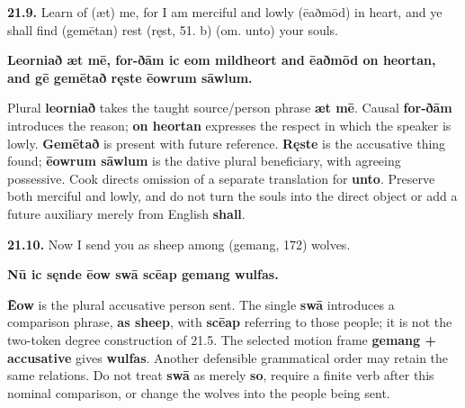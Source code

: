 \par\begin{minipage}{\linewidth}\raggedright
\textbf{21.9.} Learn of (æt) me, for I am merciful and lowly (ēaðmōd) in heart, and ye shall find (gemētan) rest (ręst, 51. b) (om. unto) your souls.

\textbf{Leorniað æt mē, for-ðām ic eom mildheort and ēaðmōd on heortan, and gē gemētað ręste ēowrum sāwlum.}

Plural \textbf{leorniað} takes the taught source/\allowbreak{}person phrase \textbf{æt mē}. Causal \textbf{for-ðām} introduces the reason; \textbf{on heortan} expresses the respect in which the speaker is lowly. \textbf{Gemētað} is present with future reference. \textbf{Ręste} is the accusative thing found; \textbf{ēowrum sāwlum} is the dative plural beneficiary, with agreeing possessive. Cook directs omission of a separate translation for \textbf{unto}. Preserve both merciful and lowly, and do not turn the souls into the direct object or add a future auxiliary merely from English \textbf{shall}.

\end{minipage}\par\addvspace{4pt}

\par\begin{minipage}{\linewidth}\raggedright
\textbf{21.10.} Now I send you as sheep among (gemang, 172) wolves.

\textbf{Nū ic sęnde ēow swā scēap gemang wulfas.}

\textbf{Ēow} is the plural accusative person sent. The single \textbf{swā} introduces a comparison phrase, \textbf{as sheep}, with \textbf{scēap} referring to those people; it is not the two-token degree construction of 21.5. The selected motion frame \textbf{gemang + accusative} gives \textbf{wulfas}. Another defensible grammatical order may retain the same relations. Do not treat \textbf{swā} as merely \textbf{so}, require a finite verb after this nominal comparison, or change the wolves into the people being sent.

\end{minipage}\par\addvspace{4pt}

